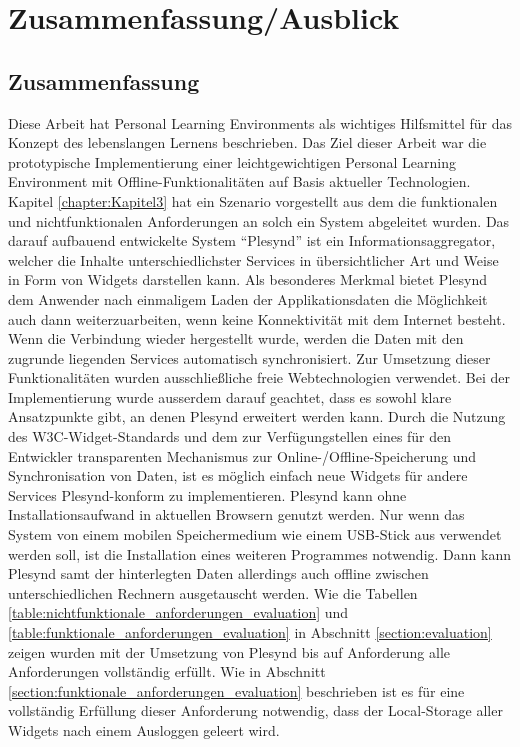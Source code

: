 \chapter{Zusammenfassung/Ausblick} 
\label{chapter:Kapitel7}

\section{Zusammenfassung}
Diese Arbeit hat Personal Learning Environments als wichtiges Hilfsmittel für das Konzept des lebenslangen Lernens beschrieben. Das Ziel dieser Arbeit war die prototypische Implementierung einer leichtgewichtigen Personal Learning Environment mit Offline-Funktionalitäten auf Basis aktueller Technologien. Kapitel \ref{chapter:Kapitel3} hat ein Szenario vorgestellt aus dem die funktionalen und nichtfunktionalen Anforderungen an solch ein System abgeleitet wurden. Das darauf aufbauend entwickelte System "`Plesynd"' ist ein Informationsaggregator, welcher die Inhalte unterschiedlichster Services in übersichtlicher Art und Weise in Form von Widgets darstellen kann. Als besonderes Merkmal bietet Plesynd dem Anwender nach einmaligem Laden der Applikationsdaten die Möglichkeit auch dann weiterzuarbeiten, wenn keine Konnektivität mit dem Internet besteht. Wenn die Verbindung wieder hergestellt wurde, werden die Daten mit den zugrunde liegenden Services automatisch synchronisiert. Zur Umsetzung dieser Funktionalitäten wurden ausschließliche freie Webtechnologien verwendet. Bei der Implementierung wurde ausserdem darauf geachtet, dass es sowohl klare Ansatzpunkte gibt, an denen Plesynd erweitert werden kann. Durch die Nutzung des W3C-Widget-Standards und dem zur Verfügungstellen eines für den Entwickler transparenten Mechanismus zur Online-/Offline-Speicherung und Synchronisation von Daten, ist es möglich einfach neue Widgets für andere Services Plesynd-konform zu implementieren. Plesynd kann ohne Installationsaufwand in aktuellen Browsern genutzt werden. Nur wenn das System von einem mobilen Speichermedium wie einem USB-Stick aus verwendet werden soll, ist die Installation eines weiteren Programmes notwendig. Dann kann Plesynd samt der hinterlegten Daten allerdings auch offline zwischen unterschiedlichen Rechnern ausgetauscht werden.  Wie die Tabellen \ref{table:nichtfunktionale_anforderungen_evaluation} und \ref{table:funktionale_anforderungen_evaluation} in Abschnitt \ref{section:evaluation} zeigen wurden mit der Umsetzung von Plesynd bis auf Anforderung  alle Anforderungen vollständig erfüllt. Wie in Abschnitt \ref{section:funktionale_anforderungen_evaluation} beschrieben ist es für eine vollständig Erfüllung dieser Anforderung notwendig, dass der Local-Storage aller Widgets nach einem Ausloggen geleert wird. 


